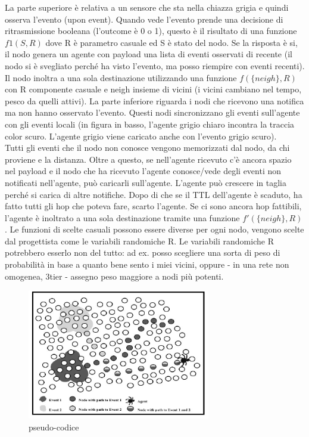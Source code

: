 \documentclass[12pt,italian]{report}
\begin{document}
\bigbreak
La parte superiore è relativa a un sensore che sta nella chiazza grigia e quindi osserva l'evento (upon event). Quando vede l'evento prende una decisione di ritrasmissione booleana (l'outcome è 0 o 1), questo è il risultato di una funzione $f1(S,R)$ dove R è parametro casuale ed S è stato del nodo. Se la risposta è si, il nodo genera un agente con payload una lista di eventi osservati di recente (il nodo si è svegliato perché ha visto l'evento, ma posso riempire con eventi recenti). Il nodo inoltra a una sola destinazione utilizzando una funzione $f(\{neigh\}, R)$ con R componente casuale e {neigh} insieme di vicini (i vicini cambiano nel tempo, pesco da quelli attivi). 
\bigbreak
La parte inferiore riguarda i nodi che ricevono una notifica ma non hanno osservato l'evento. Questi nodi sincronizzano gli eventi sull'agente con gli eventi locali (in figura in basso, l'agente grigio chiaro incontra la traccia color scuro. L'agente grigio viene caricato anche con l'evento grigio scuro). \\ Tutti gli eventi che il nodo non conosce vengono memorizzati dal nodo, da chi proviene e la distanza. Oltre a questo, se nell'agente ricevuto c'è ancora spazio nel payload e il nodo che ha ricevuto l'agente conosce/vede degli eventi non notificati nell'agente, può caricarli sull'agente. L'agente può crescere in taglia perché si carica di altre notifiche. 
\bigbreak
Dopo di che se il TTL dell'agente è scaduto, ha fatto tutti gli hop che poteva fare, scarto l'agente. Se ci sono ancora hop fattibili, l'agente è inoltrato a una sola destinazione tramite una funzione $f'(\{neigh\}, R)$. 
\bigbreak
Le funzioni di scelte casuali possono essere diverse per ogni nodo, vengono scelte dal progettista come le variabili randomiche R. Le variabili randomiche R potrebbero esserlo non del tutto: ad ex. posso scegliere una sorta di peso di probabilità in base a quanto bene sento i miei vicini, oppure - in una rete non omogenea, 3tier - assegno peso maggiore a nodi più potenti. 
\begin{figure}[h]
\centering
\includegraphics[width=80mm]{img/agent.PNG}
\caption{pseudo-codice}
\label{fig:ps}
\end{figure}
\end{document}
